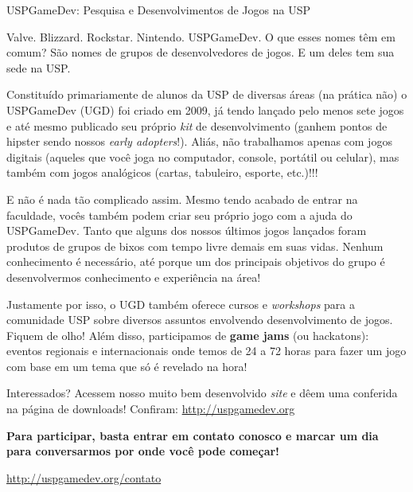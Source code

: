\begin{subsecao}{USPGameDev: Pesquisa e Desenvolvimentos de Jogos na USP}


Valve. Blizzard. Rockstar. Nintendo. USPGameDev. O que esses nomes têm em comum?
São nomes de grupos de desenvolvedores de jogos. E um deles tem sua sede na USP.

Constituído primariamente de alunos da USP de diversas áreas (na prática não) o
USPGameDev (UGD) foi criado em 2009, já tendo lançado pelo menos sete jogos e
até mesmo publicado seu próprio \textit{kit} de desenvolvimento (ganhem pontos
de hipster sendo nossos \textit{early adopters}!). Aliás, não trabalhamos apenas
com jogos digitais (aqueles que você joga no computador, console, portátil ou
celular), mas também com jogos analógicos (cartas, tabuleiro, esporte, etc.)!!!

E não é nada tão complicado assim. Mesmo tendo acabado de entrar na faculdade,
vocês também podem criar seu próprio jogo com a ajuda do USPGameDev. Tanto que
alguns dos nossos últimos jogos lançados foram produtos de grupos de bixos com
tempo livre demais em suas vidas. Nenhum conhecimento é necessário, até porque
um dos principais objetivos do grupo é desenvolvermos conhecimento e experiência
na área!

Justamente por isso, o UGD também oferece cursos e \textit{workshops} para a
comunidade USP sobre diversos assuntos envolvendo desenvolvimento de jogos.
Fiquem de olho! Além disso, participamos de \textbf{game jams} (ou hackatons):
eventos regionais e internacionais onde temos de 24 a 72 horas para fazer um
jogo com base em um tema que só é revelado na hora!

Interessados? Acessem nosso muito bem desenvolvido \textit{site} e dêem uma
conferida na página de downloads! Confiram: \url{http://uspgamedev.org}

\textbf{Para participar, basta entrar em contato conosco e marcar um dia para
conversarmos por onde você pode começar!}

\vspace{-1.5em}

\begin{center}
  \Large
  \url{http://uspgamedev.org/contato}
\end{center}

\vspace{-1.5em}

\end{subsecao}
